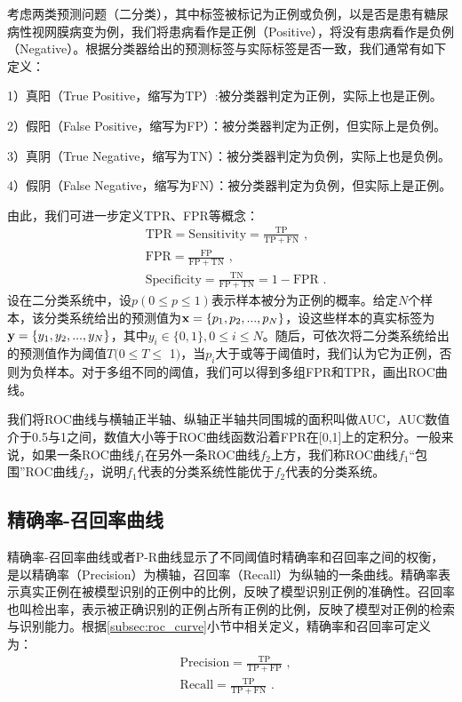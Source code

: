 考虑两类预测问题（二分类），其中标签被标记为正例或负例，以是否是患有糖尿病性视网膜病变为例，我们将患病看作是正例（Positive），将没有患病看作是负例（Negative）。根据分类器给出的预测标签与实际标签是否一致，我们通常有如下定义：

1）真阳（True Positive，缩写为TP）:被分类器判定为正例，实际上也是正例。

2）假阳（False Positive，缩写为FP）：被分类器判定为正例，但实际上是负例。

3）真阴（True Negative，缩写为TN）：被分类器判定为负例，实际上也是负例。

4）假阴（False Negative，缩写为FN）：被分类器判定为负例，但实际上是正例。

\noindent 由此，我们可进一步定义TPR、FPR等概念：
\begin{align}
	&\mathrm{TPR}=\mathrm{Sensitivity}=\frac{\mathrm{TP}}{\mathrm{TP}+\mathrm{FN}}\,\, ,\\
	&\mathrm{FPR}=\frac{\mathrm{FP}}{\mathrm{FP}+\mathrm{TN}}\,\, ,\\
	&\mathrm{Specificity}=\frac{\mathrm{TN}}{\mathrm{FP}+\mathrm{TN}}=1-\mathrm{FPR}\,\, .
\end{align}
设在二分类系统中，设$p(0\leq p \leq 1)$表示样本被分为正例的概率。给定$N$个样本，该分类系统给出的预测值为$\mathbf{x}=\{p_1,p_2,...,p_N
\}$，设这些样本的真实标签为$\mathbf{y}=\{y_1,y_2,...,y_N\}$，其中$y_i \in \{0,1\},0\leq i \le N$。随后，可依次将二分类系统给出的预测值作为阈值$T($0$\leq T \leq$ 1$)$，当$p_i$大于或等于阈值时，我们认为它为正例，否则为负样本。对于多组不同的阈值，我们可以得到多组FPR和TPR，画出ROC曲线。

我们将ROC曲线与横轴正半轴、纵轴正半轴共同围城的面积叫做AUC，AUC数值介于0.5与1之间，数值大小等于ROC曲线函数沿着FPR在[0,1]上的定积分。一般来说，如果一条ROC曲线$f_1$在另外一条ROC曲线$f_2$上方，我们称ROC曲线$f_1$“包围”ROC曲线$f_2$，说明$f_1$代表的分类系统性能优于$f_2$代表的分类系统。
\subsection{精确率-召回率曲线}\label{subsec:pr_curve}
精确率-召回率曲线或者P-R曲线显示了不同阈值时精确率和召回率之间的权衡，是以精确率（Precision）为横轴，召回率（Recall）为纵轴的一条曲线。精确率表示真实正例在被模型识别的正例中的比例，反映了模型识别正例的准确性。召回率也叫检出率，表示被正确识别的正例占所有正例的比例，反映了模型对正例的检索与识别能力。根据\ref{subsec:roc_curve}小节中相关定义，精确率和召回率可定义为：
\begin{align}
	&\mathrm{Precision}=\frac{\mathrm{TP}}{\mathrm{TP}+\mathrm{FP}}\, \, ,\\
	&\mathrm{Recall}=\frac{\mathrm{TP}}{\mathrm{TP}+\mathrm{FN}}\, \, .
\end{align}

